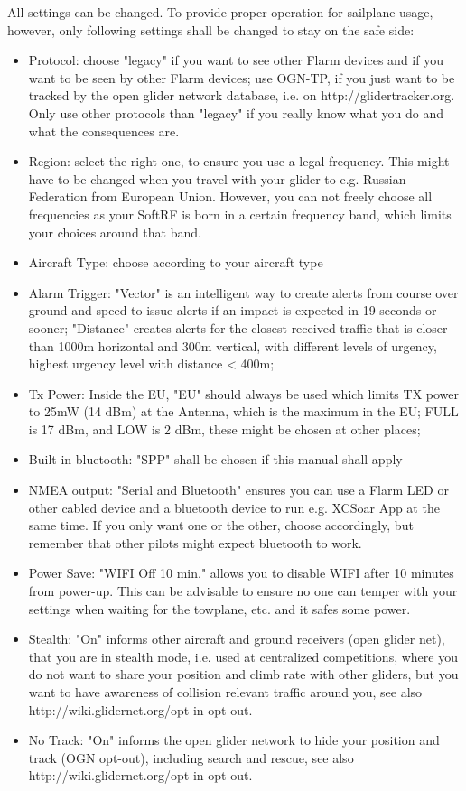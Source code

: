 \documentclass[11pt,a4paper]{article}
\begin{document}
All settings can be changed. To provide proper operation for sailplane usage, however, only following settings shall be changed to stay on the safe side:

\begin{itemize}
\item Protocol: choose "legacy" if you want to see other Flarm devices and if you want to be seen by other Flarm devices; use OGN-TP, if you just want to be tracked by the open glider network database, i.e. on http://glidertracker.org. Only use other protocols than "legacy" if you really know what you do and what the consequences are.
\item Region: select the right one, to ensure you use a legal frequency. This might have to be changed when you travel with your glider to e.g. Russian Federation from European Union. However, you can not freely choose all frequencies as your SoftRF is born in a certain frequency band, which limits your choices around that band.
\item Aircraft Type: choose according to your aircraft type
\item Alarm Trigger: "Vector" is an intelligent way to create alerts from course over ground and speed to issue alerts if an impact is expected in 19 seconds or sooner; "Distance" creates alerts for the closest received traffic that is closer than 1000m horizontal and 300m vertical, with different levels of urgency, highest urgency level with distance < 400m;
\item Tx Power: Inside the EU, "EU" should always be used which limits TX power to 25mW (14 dBm) at the Antenna, which is the maximum in the EU; FULL is 17 dBm, and LOW is 2 dBm, these might be chosen at other places;
\item Built-in bluetooth: "SPP" shall be chosen if this manual shall apply
\item NMEA output: "Serial and Bluetooth" ensures you can use a Flarm LED or other cabled device and a bluetooth device to run e.g. XCSoar App at the same time. If you only want one or the other, choose accordingly, but remember that other pilots might expect bluetooth to work.
\item Power Save: "WIFI Off 10 min." allows you to disable WIFI after 10 minutes from power-up. This can be advisable to ensure no one can temper with your settings when waiting for the towplane, etc. and it safes some power.
\item Stealth: "On" informs other aircraft and ground receivers (open glider net), that you are in stealth mode, i.e. used at centralized competitions, where you do not want to share your position and climb rate with other gliders, but you want to have awareness of collision relevant traffic around you, see also http://wiki.glidernet.org/opt-in-opt-out.
\item No Track: "On" informs the open glider network to hide your position and track (OGN opt-out), including search and rescue, see also http://wiki.glidernet.org/opt-in-opt-out.
\end{itemize}
\end{document}
